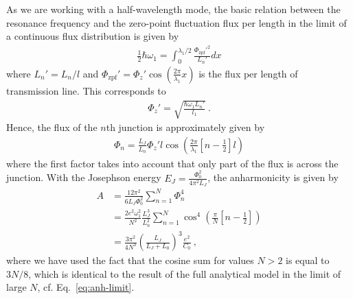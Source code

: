 As we are working with a half-wavelength mode, the basic relation between the resonance frequency and the zero-point fluctuation flux per length in the limit of a continuous flux distribution is given by
%
\begin{align}
\frac{1}{2}\hbar \omega_1 = \int_0^{\lambda_1/2} \frac{\Phi_\text{zpf}'^2}{L_n'} dx
\end{align}
%
where $L_n' = L_n/l$ and $\Phi_\text{zpf}' = \Phi_z'\cos\left(\frac{2\pi}{\lambda_1}x\right)$ is the flux per length of transmission line.
%
This corresponds to
%
\begin{align}
\Phi_z' = \sqrt{\frac{\hbar \omega_1 L_n'}{l_1}}\ .
\end{align}
%
Hence, the flux of the $n$th junction is approximately given by
%
\begin{align}
\Phi_n = \frac{L_J}{L_n}\Phi_z' l \cos{\left(\frac{2\pi}{\lambda_1}\left[n-\frac{1}{2}\right]l\right)}
\end{align}
%
where the first factor takes into account that only part of the flux is across the junction.
%
With the Josephson energy $E_J = \frac{\Phi_0^2}{4\pi^2 L_J}$, the anharmonicity is given by
%
\begin{align}
A &= \frac{12\pi^2}{6L_J\Phi_0^2}\sum_{n=1}^N \Phi_n^4 \\
&= \frac{2e^2 \omega_1^2}{N^2} \frac{L_J^3}{L_n^2}\sum_{n=1}^{N}\cos^4\left(\frac{\pi}{N}\left[n-\frac{1}{2}\right] \right) \\
&= \frac{3\pi^2}{4N^3}\left(\frac{L_J}{L_J+L_0}\right)^3 \frac{e^2}{C_0} \ ,
\label{eq:anh-closed}
\end{align}
%
where we have used the fact that the cosine sum for values $N>2$ is equal to $3N/8$, which is identical to the result of the full analytical model in the limit of large $N$, cf. Eq.~\eqref{eq:anh-limit}.



